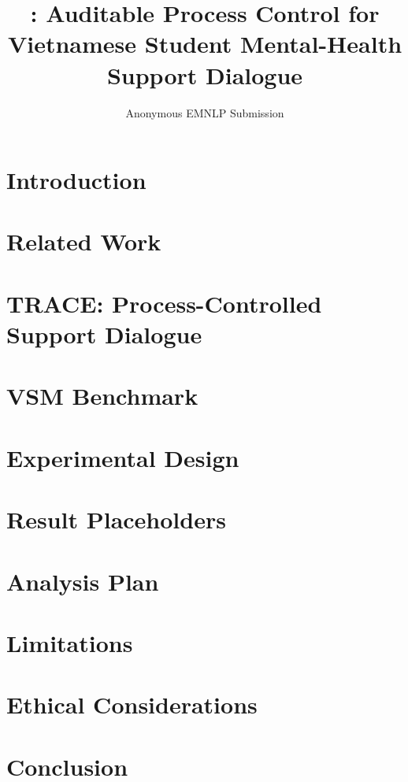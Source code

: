 \documentclass[11pt]{article}
\title{\trace: Auditable Process Control for Vietnamese Student Mental-Health Support Dialogue}
\author{Anonymous EMNLP Submission}
\newcommand{\trace}{\textsc{TRACE}}
\begin{document}
\maketitle

\begin{abstract}

\end{abstract}

\section{Introduction}


\section{Related Work}


\section{\trace: Process-Controlled Support Dialogue}


\section{VSM Benchmark}


\section{Experimental Design}


\section{Result Placeholders}


\section{Analysis Plan}


\section{Limitations}


\section{Ethical Considerations}


\section{Conclusion}




\end{document}

